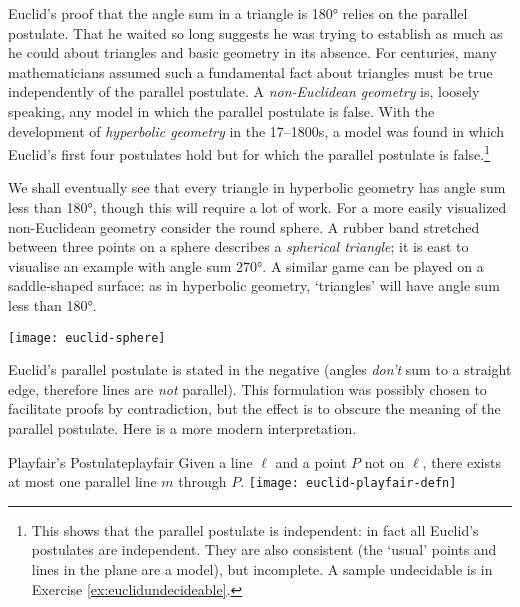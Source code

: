 Euclid's proof that the angle sum in a triangle is \ang{180} relies on the parallel postulate. That he waited so long suggests he was trying to establish as much as he could about triangles and basic geometry in its absence. For centuries, many mathematicians assumed such a fundamental fact about triangles must be true independently of the parallel postulate.\smallbreak
A \emph{non-Euclidean geometry} is, loosely speaking, any model in which the parallel postulate is false. With the development of \emph{hyperbolic geometry} in the 17--1800s, a model was found in which Euclid's first four postulates hold but for which the parallel postulate is false.\footnote{This shows that the parallel postulate is independent: in fact all Euclid's postulates are independent. They are also consistent (the `usual' points and lines in the plane are a model), but incomplete. A sample undecidable is in Exercise \ref{ex:euclidundecideable}.}\par

\begin{minipage}[t]{0.76\linewidth}\vspace{-5pt}
	We shall eventually see that every triangle in hyperbolic geometry has angle sum less than \ang{180}, though this will require a lot of work. For a more easily visualized non-Euclidean geometry consider the round sphere. A rubber band stretched between three points on a sphere describes a \emph{spherical triangle}; it is east to visualise an example with angle sum \ang{270}. A similar game can be played on a saddle-shaped surface: as in hyperbolic geometry, `triangles' will have angle sum less than \ang{180}.
\end{minipage}
\hfill
\begin{minipage}[t]{0.23\linewidth}\vspace{-10pt}
	\flushright
	\texttt{[image: euclid-sphere]}
\end{minipage}

\goodbreak




Euclid's parallel postulate is stated in the negative (angles \emph{don't} sum to a straight edge, therefore lines are \emph{not} parallel). This formulation was possibly chosen to facilitate proofs by contradiction, but the effect is to obscure the meaning of the parallel postulate. Here is a more modern interpretation.

\begin{axiom}[lower separated=false, sidebyside, sidebyside align=top seam, sidebyside gap=0pt, righthand width=0.37\linewidth]{Playfair's Postulate}{playfair}
	Given a line $\ell$ and a point $P$ not on $\ell$, there exists at most one parallel line $m$ through $P$.
	\tcblower
	\flushright
	\texttt{[image: euclid-playfair-defn]}
\end{axiom}


